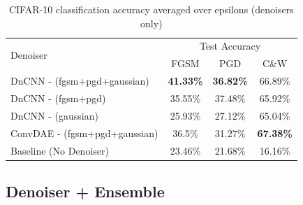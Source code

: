 \documentclass[10pt,journal,compsoc]{IEEEtran}
\begin{document}
\begin{table}[!h]
\renewcommand{\arraystretch}{1.3}
\caption{CIFAR-10 classification accuracy averaged over epsilons (denoisers only)}
\label{table:acc}
\centering
\begin{tabular}{|l||c|c|c|}
\hline
\multirow{2}{*}{Denoiser}
 & \multicolumn{3}{|c|}{Test Accuracy} \\
 \cline{2-4}
 & FGSM & PGD & C\&W \\
\hline\hline
DnCNN - (fgsm+pgd+gaussian) & \textbf{41.33\%} & \textbf{36.82\%} & 66.89\%\\
\hline
DnCNN - (fgsm+pgd) &35.55\% & 37.48\% & 65.92\%\\
\hline
DnCNN - (gaussian) &25.93\% & 27.12\% & 65.04\%\\
\hline
ConvDAE - (fgsm+pgd+gaussian) &36.5\% & 31.27\% & \textbf{67.38\%}\\
\hline
Baseline (No Denoiser) &23.46\% & 21.68\% & 16.16\%\\
\hline
\end{tabular}
\end{table}










\subsection{Denoiser + Ensemble}
\end{document}
